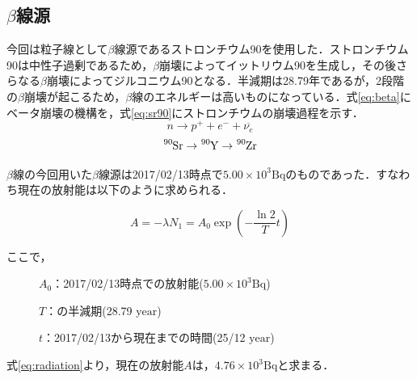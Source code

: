 \subsection*{$\beta$線源}
今回は粒子線として$\beta$線源であるストロンチウム90を使用した．ストロンチウム90は中性子過剰であるため，$\beta$崩壊によってイットリウム90を生成し，その後さらなる$\beta$崩壊によってジルコニウム90となる．半減期は28.79年であるが，2段階の$\beta$崩壊が起こるため，$\beta$線のエネルギーは高いものになっている．式\ref{eq:beta}にベータ崩壊の機構を，式\ref{eq:sr90}にストロンチウムの崩壊過程を示す．\\
\begin{equation}
  \label{eq:beta}
  n \rightarrow p^{+} + e^{-} + \overline{\nu_e}
\end{equation}
\begin{equation}
  \label{eq:sr90}
  \ce{^{90}Sr} \rightarrow \ce{^{90}Y} \rightarrow \ce{^{90}Zr}
\end{equation}


$\beta$線の今回用いた$\beta$線源は2017/02/13時点で$ 5.00 \times 10^3 \mathrm{Bq}$のものであった．すなわち現在の放射能は以下のように求められる．

\begin{equation}
\label{eq:radiation}
  A = -\lambda N_1 = A_0 \exp \left( - \frac{\ln 2}{T} t \right)
\end{equation}

ここで，
\begin{description}
\item[] $A_0$：2017/02/13時点での放射能($ 5.00 \times 10^3 \mathrm{Bq}$)
\item[] $T$：の半減期(28.79 $\mathrm{year}$)
\item[] $t$：2017/02/13から現在までの時間(25/12 $\mathrm{year}$)
\end{description}

式\ref{eq:radiation}より，現在の放射能$A$は，$4.76 \times 10^3 \mathrm{Bq}$と求まる．
  




